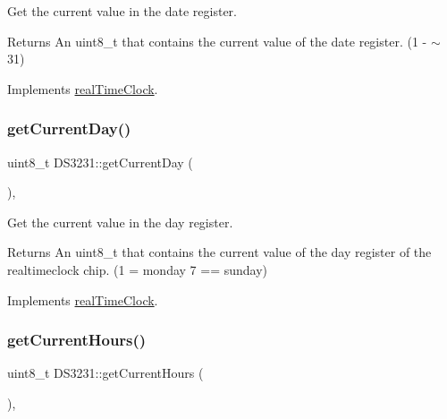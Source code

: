 Get the current value in the date register. 

\begin{DoxyReturn}{Returns}
An uint8\+\_\+t that contains the current value of the date register. (1 -\/ $\sim$31) 
\end{DoxyReturn}


Implements \mbox{\hyperlink{classreal_time_clock_a910bce5ee911c18bd34a4154953ce2ac}{real\+Time\+Clock}}.

\mbox{\label{class_d_s3231_a813bbe55a08e1911d498511795721477}} 
\subsubsection{\texorpdfstring{get\+Current\+Day()}{getCurrentDay()}}
{\footnotesize\ttfamily uint8\+\_\+t D\+S3231\+::get\+Current\+Day (\begin{DoxyParamCaption}{ }\end{DoxyParamCaption})\hspace{0.3cm}{\ttfamily [override]}, {\ttfamily [virtual]}}



Get the current value in the day register. 

\begin{DoxyReturn}{Returns}
An uint8\+\_\+t that contains the current value of the day register of the realtimeclock chip. (1 = monday 7 == sunday) 
\end{DoxyReturn}


Implements \mbox{\hyperlink{classreal_time_clock_a13b8ebc25275f183a1117402fc9e5e36}{real\+Time\+Clock}}.

\mbox{\label{class_d_s3231_a019d8ed8074a02937c0777424be3d0ae}} 
\subsubsection{\texorpdfstring{get\+Current\+Hours()}{getCurrentHours()}}
{\footnotesize\ttfamily uint8\+\_\+t D\+S3231\+::get\+Current\+Hours (\begin{DoxyParamCaption}{ }\end{DoxyParamCaption})\hspace{0.3cm}{\ttfamily [override]}, {\ttfamily [virtual]}}



